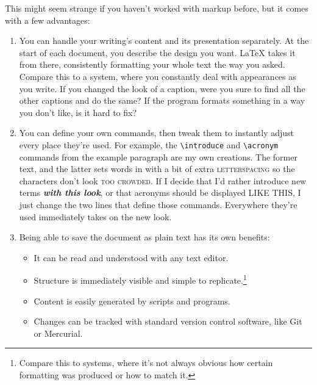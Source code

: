 This might seem strange if you haven't worked with markup before,
but it comes with a few advantages:
\begin{enumerate}
\item You can handle your writing's content and its presentation separately.
    At the start of each document,
    you describe the design you want.
    \LaTeX{} takes it from there, consistently formatting your whole text
    the way you asked.
    Compare this to a  system,
    where you constantly deal with appearances
    as you write.
    If you changed the look of a caption,
    were you sure to find all the other captions and do the
    same?
    If the program formats something in a way you don't like,
    is it hard to fix?%

\item You can define your own commands, then tweak them to instantly adjust
    every place they're used.
    For example, the \verb|\introduce| and \verb|\acronym| commands
    from the example paragraph are my own creations.
    The former  text, and the latter sets words in
     with a bit of extra
    \mbox{\textsc{letterspacing}} so the characters
    don't look \textsc{too crowded}.
    If I decide that I'd rather introduce new terms
    \textbf{\itshape with this look}, or that acronyms should be displayed
    {\small{} LIKE THIS},
    I just change the two lines that define those commands.
    Everywhere they're used immediately takes on the new look.

\item Being able to save the document as plain text has its own benefits:
    \begin{itemize}
    \item It can be read and understood with any text editor.
    \item Structure is immediately visible
        and simple to replicate.\punckern\footnote{Compare this to
         systems, where it's not always obvious
        how certain formatting was produced or how to match it.}
    \item Content is easily generated by scripts and programs.
    \item Changes can be tracked with standard version control software,
        like Git or Mercurial.
    \end{itemize}
\end{enumerate}

